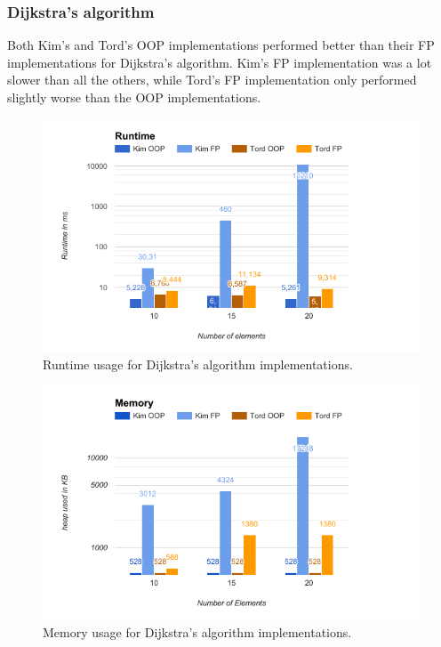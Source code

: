 \documentclass {article}
\begin{document}
\subsubsection{Dijkstra's algorithm}
Both Kim's and Tord's OOP implementations performed better than their FP implementations for Dijkstra's algorithm. Kim's FP implementation was a lot slower than all the others, while Tord's FP implementation only performed slightly worse than the OOP implementations.

\begin{figure}[H]
\includegraphics[width=\textwidth]{dijkstras-runtime}

\caption{Runtime usage for Dijkstra's algorithm implementations.}
\label{fig:dijkstras-runtime}
\end{figure}

\begin{figure}[H]
\includegraphics[width=\textwidth]{dijkstras-memory}

\caption{Memory usage for Dijkstra's algorithm implementations.}
\label{fig:dijkstras-memory}
\end{figure}
\end{document}
